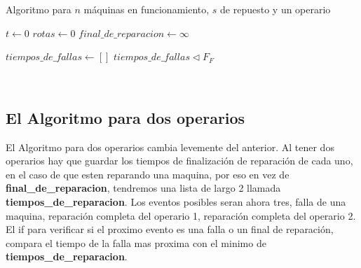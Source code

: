 \documentclass[12pt]{article}
\begin{document}
  
  \begin{algorithm}
\caption{ Algoritmo para $n$ máquinas en funcionamiento, $s$ de repuesto y un operario}
\begin{algorithmic}


\State $t \gets 0$
\State $rotas \gets 0$
\State $final\_de\_reparacion \gets  \infty$

\State $tiempos\_de\_fallas \gets [  ]$
  \State $ tiempos\_de\_fallas \lhd F_F  $

\EndFor
{}
\\
	 	 \EndIf
	 	 \EndIf
	 	 \EndIf
	\Else
		\EndIf
	       \EndIf 
	       	
	\EndIf
\EndWhile

\EndProcedure


\end{algorithmic}
\end{algorithm}

\clearpage

\subsection{El Algoritmo para dos operarios}
El Algoritmo para dos operarios cambia levemente del anterior. Al tener dos operarios hay que guardar los tiempos de finalización de reparación de cada uno, en el caso de que esten reparando una maquina, por eso en vez de {\bf final\_de\_reparacion}, tendremos una lista de largo 2 llamada {\bf tiempos\_de\_reparacion}. Los eventos posibles seran ahora tres, falla de una maquina, reparación completa del operario 1, reparación completa del operario 2.
El if para  verificar si el proximo evento es una falla o un final de reparación, compara el tiempo de la falla mas proxima con el minimo de {\bf tiempos\_de\_reparacion}.\\
\end{document}
